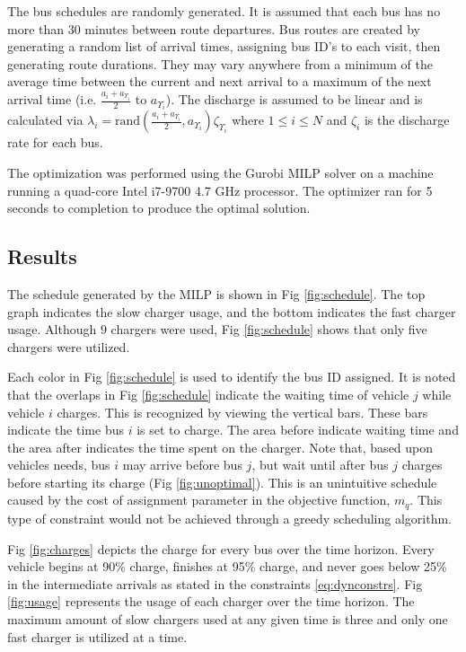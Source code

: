 \documentclass[utf8]{FrontiersinHarvard}
\begin{document}
The bus schedules are randomly generated. It is assumed that each bus has no more than 30 minutes between route
departures. Bus routes are created by generating a random list of arrival times, assigning bus ID's to each visit, then
generating route durations. They may vary anywhere from a minimum of the average time between the current and next
arrival to a maximum of the next arrival time (i.e. $\frac{a_i + a_{\Upsilon_i}}{2}$ to $a_{\Upsilon_i}$). The discharge is assumed to
be linear and is calculated via $\lambda_i = \text{rand}(\frac{a_i + a_{\Upsilon_i}}{2},a_{\Upsilon_i})\zeta_{\Upsilon_i}$ where $1 \leq i \leq N$ and $\zeta_i$
is the discharge rate for each bus.

The optimization was performed using the Gurobi MILP solver \citep{Hespanha2018} on a machine running a quad-core Intel
i7-9700 4.7 GHz processor. The optimizer ran for 5 seconds to completion to produce the optimal solution.

\subsection{Results}
The schedule generated by the MILP is shown in Fig \ref{fig:schedule}. The top graph indicates the slow charger usage,
and the bottom indicates the fast charger usage. Although $9$ chargers were used, Fig \ref{fig:schedule} shows that
only five chargers were utilized.

Each color in Fig \ref{fig:schedule} is used to identify the bus ID assigned. It is noted that the overlaps in Fig
\ref{fig:schedule} indicate the waiting time of vehicle $j$ while vehicle $i$ charges. This is recognized by viewing the
vertical bars. These bars indicate the time bus $i$ is set to charge. The area before indicate waiting time and the area
after indicates the time spent on the charger. Note that, based upon vehicles needs, bus $i$ may arrive before bus $j$,
but wait until after bus $j$ charges before starting its charge (Fig \ref{fig:unoptimal}). This is an unintuitive
schedule caused by the cost of assignment parameter in the objective function, $m_q$. This type of constraint would not
be achieved through a greedy scheduling algorithm.

Fig \ref{fig:charges} depicts the charge for every bus over the time horizon. Every vehicle begins at 90\% charge,
finishes at 95\% charge, and never goes below 25\% in the intermediate arrivals as stated in the constraints
\eqref{eq:dynconstrs}. Fig \ref{fig:usage} represents the usage of each charger over the time horizon. The maximum
amount of slow chargers used at any given time is three and only one fast charger is utilized at a time.
\end{document}
